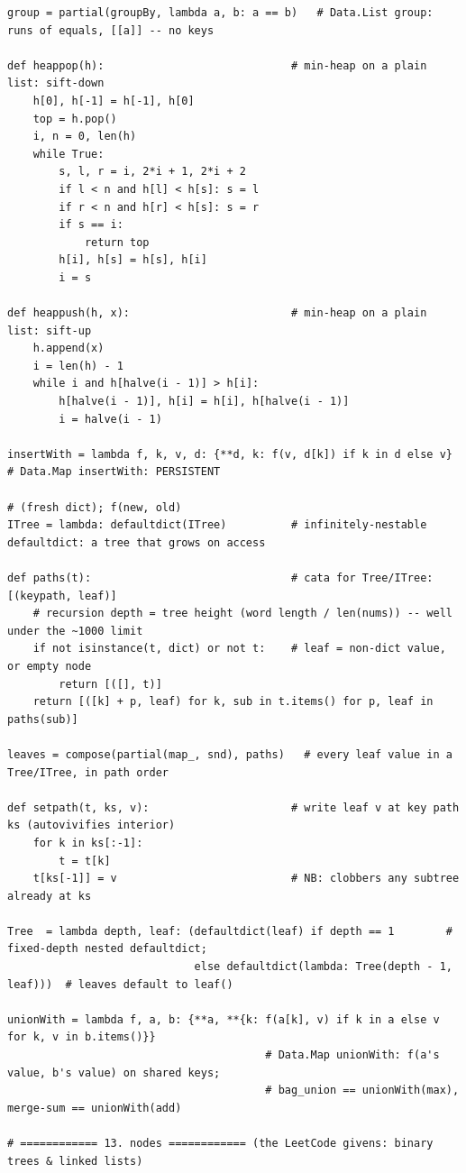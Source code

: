 \documentclass[10pt,letterpaper]{book}
\begin{document}
\begin{lstlisting}[style=file]
group = partial(groupBy, lambda a, b: a == b)   # Data.List group: runs of equals, [[a]] -- no keys

def heappop(h):                             # min-heap on a plain list: sift-down
    h[0], h[-1] = h[-1], h[0]
    top = h.pop()
    i, n = 0, len(h)
    while True:
        s, l, r = i, 2*i + 1, 2*i + 2
        if l < n and h[l] < h[s]: s = l
        if r < n and h[r] < h[s]: s = r
        if s == i:
            return top
        h[i], h[s] = h[s], h[i]
        i = s

def heappush(h, x):                         # min-heap on a plain list: sift-up
    h.append(x)
    i = len(h) - 1
    while i and h[halve(i - 1)] > h[i]:
        h[halve(i - 1)], h[i] = h[i], h[halve(i - 1)]
        i = halve(i - 1)

insertWith = lambda f, k, v, d: {**d, k: f(v, d[k]) if k in d else v}   # Data.Map insertWith: PERSISTENT
                                                                        # (fresh dict); f(new, old)
ITree = lambda: defaultdict(ITree)          # infinitely-nestable defaultdict: a tree that grows on access

def paths(t):                               # cata for Tree/ITree: [(keypath, leaf)]
    # recursion depth = tree height (word length / len(nums)) -- well under the ~1000 limit
    if not isinstance(t, dict) or not t:    # leaf = non-dict value, or empty node
        return [([], t)]
    return [([k] + p, leaf) for k, sub in t.items() for p, leaf in paths(sub)]

leaves = compose(partial(map_, snd), paths)   # every leaf value in a Tree/ITree, in path order

def setpath(t, ks, v):                      # write leaf v at key path ks (autovivifies interior)
    for k in ks[:-1]:
        t = t[k]
    t[ks[-1]] = v                           # NB: clobbers any subtree already at ks

Tree  = lambda depth, leaf: (defaultdict(leaf) if depth == 1        # fixed-depth nested defaultdict;
                             else defaultdict(lambda: Tree(depth - 1, leaf)))  # leaves default to leaf()

unionWith = lambda f, a, b: {**a, **{k: f(a[k], v) if k in a else v for k, v in b.items()}}
                                        # Data.Map unionWith: f(a's value, b's value) on shared keys;
                                        # bag_union == unionWith(max), merge-sum == unionWith(add)

# ============ 13. nodes ============ (the LeetCode givens: binary trees & linked lists)


\end{lstlisting}
\end{document}
